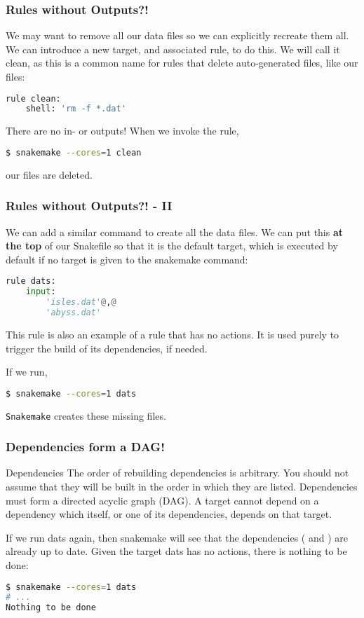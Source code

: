 \begin{frame}[fragile]
  \frametitle{Rules without Outputs?!}
  We may want to remove all our data files so we can explicitly recreate them all. We can introduce a new target, and associated rule, to do this. We will call it clean, as this is a common name for rules that delete auto-generated files, like our  files:
  \begin{lstlisting}[language=Python,style=Python]
rule clean:
    shell: 'rm -f *.dat'
  \end{lstlisting}
  There are no in- or outputs! When we invoke the rule, 
  \begin{lstlisting}[language=Bash, style=Shell]
$ snakemake --cores=1 clean
  \end{lstlisting}
  our   files are deleted.
\end{frame}

\begin{frame}[fragile]
  \frametitle{Rules without Outputs?! - II }
  We can add a similar command to create all the data files. We can put this \textbf{at the top} of our Snakefile so that it is the default target, which is executed by default if no target is given to the snakemake command:
  \begin{lstlisting}[language=Python,style=Python]
rule dats:
    input:
        'isles.dat'@,@
        'abyss.dat'
  \end{lstlisting}
  This rule is also an example of a rule that has no actions. It is used purely to trigger the build of its dependencies, if needed.

  If we run,
  \begin{lstlisting}[language=Bash, style=Shell] 
$ snakemake --cores=1 dats
  \end{lstlisting}
  \texttt{Snakemake} creates these missing files.
\end{frame}

\begin{frame}[fragile]
  \frametitle{Dependencies form a DAG!}
  \begin{exampleblock}{Dependencies}
    The order of rebuilding dependencies is arbitrary. You should not assume that they will be built in the order in which they are listed.
    Dependencies must form a directed acyclic graph (DAG). A target cannot depend on a dependency which itself, or one of its dependencies, depends on that target.
  \end{exampleblock}
  If we run dats again, then snakemake will see that the dependencies ( and ) are already up to date. Given the target dats has no actions, there is nothing to be done:
  \begin{lstlisting}[language=Bash, style=Shell] 
$ snakemake --cores=1 dats
# ...
Nothing to be done
  \end{lstlisting}
\end{frame}

